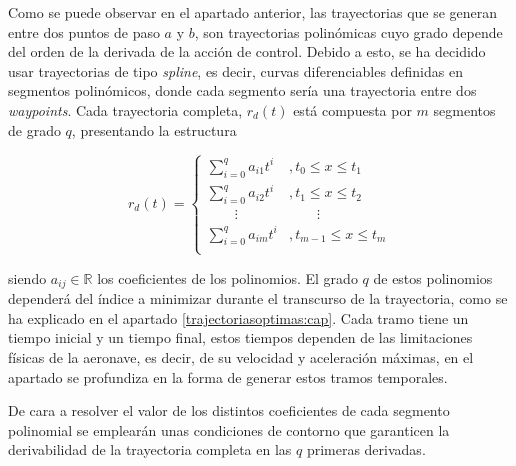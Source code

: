 Como se puede observar en el apartado anterior, las trayectorias que se generan entre dos puntos de paso $a$ y $b$, son trayectorias polinómicas cuyo grado depende del orden de la derivada de la acción de control. Debido a esto, se ha decidido usar trayectorias de tipo \textit{spline}, es decir, curvas diferenciables definidas en segmentos polinómicos, donde cada segmento sería una trayectoria entre dos \textit{waypoints}. Cada trayectoria completa, $r_d(t)$ está compuesta por $m$ segmentos de grado $q$, presentando la estructura

\begin{equation}
	r_d(t) = \left\{ 
	\begin{array}{ll}
		\sum_{i=0}^{q}a_{i1}t^{i} &,t_0\leq x \leq t_1 \\
		\sum_{i=0}^{q}a_{i2}t^{i} &,t_1\leq x \leq t_2 \\
		\qquad\vdots &\qquad\vdots \\
		\sum_{i=0}^{q}a_{im}t^{i} &,t_{m-1}\leq x \leq t_m \\
	\end{array}
	\right.
\end{equation}

siendo $a_{ij}\in \mathbb{R}$ los coeficientes de los polinomios. El grado $q$ de estos polinomios dependerá del índice a minimizar durante el transcurso de la trayectoria, como se ha explicado en el apartado \ref{trajectoriasoptimas:cap}. Cada tramo tiene un tiempo inicial y un tiempo final, estos tiempos dependen de las limitaciones físicas de la aeronave, es decir, de su velocidad y aceleración máximas, en el apartado  se profundiza en la forma de generar estos tramos temporales.

De cara a resolver el valor de los distintos coeficientes de cada segmento polinomial se emplearán unas condiciones de contorno que garanticen la derivabilidad de la trayectoria completa en las $q$ primeras derivadas. 

